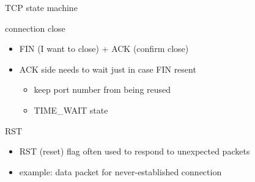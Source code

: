 \begin{frame}{TCP state machine}
\end{frame}

\begin{frame}{connection close}
    \begin{itemize}
    \item FIN (I want to close) + ACK (confirm close)
    \vspace{.5cm}
    \item ACK side needs to wait just in case FIN resent
        \begin{itemize}
        \item keep port number from being reused
        \item TIME\_WAIT state
        \end{itemize}
    \end{itemize}
\end{frame}

\begin{frame}{RST}
    \begin{itemize}
    \item RST (reset) flag often used to respond to unexpected packets
    \item example: data packet for never-established connection
    \end{itemize}
\end{frame}
